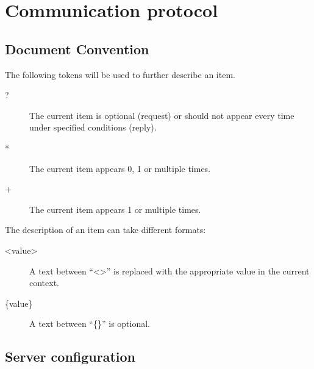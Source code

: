 \chapter{Communication protocol}
\label{chapter:communication_protocol}

\section{Document Convention}

The following tokens will be used to further describe an item.

\begin{description}
\item[?]
  The current item is optional (request) or should not appear every time under specified conditions (reply).
\item[*]
  The current item appears 0, 1 or multiple times.
\item[+]
  The current item appears 1 or multiple times.
\end{description}
The description of an item can take different formats:
\begin{description}
  \item[\textless{}value\textgreater{}]
    A text between ``\textless{}\textgreater{}'' is replaced with the appropriate value in the current context.
  \item[\{value\}]
    A text between  ``\{\}'' is optional.
\end{description}


\section{Server configuration}
\label{section:communication_protocol:server}

